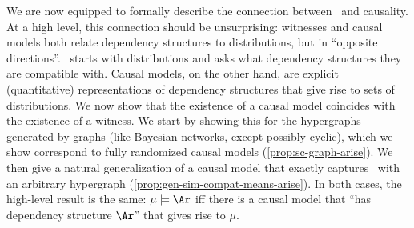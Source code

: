 We are now equipped to formally describe the connection between \scibility\ and causality.
At a high level, this connection should be unsurprising:
witnesses and causal models both relate dependency structures to distributions, 
but in ``opposite directions''.
\Scibility\ starts with distributions and asks what dependency structures they are compatible with. Causal models, on the other hand, are explicit (quantitative) representations of dependency structures that give rise to sets of distributions.
We now show that the existence of a causal model coincides with the existence of a witness. 
We start by showing this for the hypergraphs generated by graphs (like Bayesian
networks, except possibly cyclic), which we show
correspond to
fully randomized causal models (\cref{prop:sc-graph-arise}).  
We then give a natural generalization of a causal model that exactly captures \scibility\ with an arbitrary hypergraph (\cref{prop:gen-sim-compat-means-arise}). 
In both cases,
the high-level result is the same: $\mu \models \Ar$ iff there is a 
causal model that ``has dependency structure $\Ar$''
that gives rise to $\mu$. 

